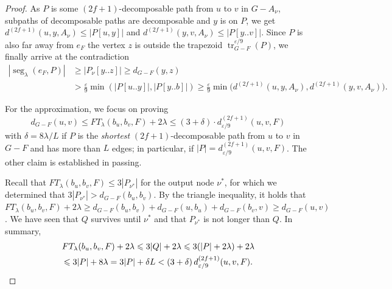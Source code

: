 \documentclass{theoretics}
\DeclareMathOperator{\tr}{tr}
\DeclareMathOperator{\seg}{seg}
\newcommand*{\length}[1]{|#1|}
\renewcommand{\leq}{\leqslant}
\renewcommand{\le}{\leqslant}
\renewcommand{\ge}{\geqslant}
\newcommand{\eps}{\varepsilon}
\begin{document}
\begin{proof}
As $P$ is some $(2f{+}1)$-decomposable path from $u$ to $v$ in $G-A_{\nu}$,
subpaths of decomposable paths are decomposable and $y$ is on $P$,
we get $d^{(2f+1)}(u,y,A_{\nu}) \le \length{P[u,y]}$ 
and $d^{(2f+1)}(y,v,A_{\nu}) \le \length{P[y..v]}$.
Since $P$ is also far away from $e_F$ the vertex $z$ is outside the trapezoid 
$\tr^{\eps/9}_{G-F}(P)$, we finally arrive at the contradiction
\begin{align*}
	\length{\seg_{\lambda}(e_F,P)} &\ge \length{P_{\nu}[y..z]} \ge d_{G-F}(y,z)\\
		&> \frac{\eps}{9} \min(\length{P[u..y]},\length{P[y..b]}) 
			\ge \frac{\varepsilon}{9} \min\!\big(d^{(2f+1)}(u,y,A_{\nu}), d^{(2f+1)}(y,v,A_{\nu})\big).
\end{align*}

For the approximation, we focus on proving 
\begin{equation*}
	d_{G-F}(u,v) \leq FT_{\lambda}(b_u,b_v,F) + 2\lambda 
	\leq (3{+}\delta) \cdot d^{(2f+1)}_{\eps/9}(u,v,F)
\end{equation*}
with $\delta = 8\lambda/L$
if $P$ is the \emph{shortest} $(2f{+}1)$-decomposable path from $u$ to $v$ in $G-F$
and has more than $L$ edges;
in particular, if $\length{P} = d^{(2f+1)}_{\eps/9}(u,v,F)$.
The other claim is established in passing.

Recall that $FT_{\lambda}(b_u,b_v,F) \le 3 \length{P_{\nu^*}}$ for the output node $\nu^*$,
for which we determined that $3 \length{P_{\nu^*}} > d_{G-F}(b_u,b_v)$.
By the triangle inequality, it holds that
$FT_{\lambda}(b_u,b_v,F) + 2\lambda \ge d_{G-F}(b_u,b_v) + d_{G-F}(u,b_u) + d_{G-F}(b_v,v) 
	\ge d_{G-F}(u,v)$.
%
We have seen that $Q$ survives until $\nu^*$ and that $P_{\nu^*}$ is not longer than $Q$.
In summary,
\begin{multline*}
	FT_{\lambda}(b_u,b_v,F) + 2\lambda \le 3 \length{Q} + 2\lambda
		 \le 3 (\length{P} + 2\lambda) + 2\lambda\\
		 \le 3 \length{P} + 8\lambda =  3 \length{P} + \delta L 
		 < (3+\delta) \, d^{(2f+1)}_{\eps/9}(u,v,F). \qedhere
\end{multline*}
\end{proof} 
\end{document}
